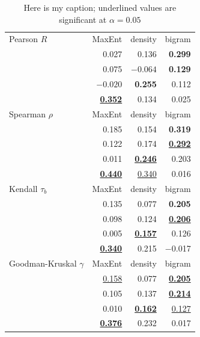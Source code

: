 \begin{table}
\centering
\begin{tabular}{l r r r}
\toprule
Pearson $R$                 & MaxEnt              & density             & bigram              \\
\citealt{Greenberg1964a} & 0.027               & 0.136               & \textbf{0.299}      \\
\citealt{Scholes1966}    & 0.075               & $-0.064$            & \textbf{0.129}      \\
\citealt{Albright2003a}  & $-0.020$            & \textbf{0.255}      & 0.112               \\
\citealt{Albright2007}   & \ul{\textbf{0.352}} & 0.134               & 0.025               \\
\bottomrule
Spearman $\rho$             & MaxEnt              & density             & bigram              \\
\midrule
\citealt{Greenberg1964a} & 0.185               & 0.154               & \textbf{0.319}      \\
\citealt{Scholes1966}    & 0.122               & 0.174               & \ul{\textbf{0.292}} \\
\citealt{Albright2003a}  & 0.011               & \ul{\textbf{0.246}} & 0.203               \\
\citealt{Albright2007}   & \ul{\textbf{0.440}} & \ul{0.340}          & 0.016               \\ 
\bottomrule
Kendall $\tau_b$            & MaxEnt              & density             & bigram \\
\midrule
\citealt{Greenberg1964a} & 0.135               & 0.077               & \textbf{0.205}      \\
\citealt{Scholes1966}    & 0.098               & 0.124               & \ul{\textbf{0.206}} \\
\citealt{Albright2003a}  & 0.005               & \ul{\textbf{0.157}} & 0.126               \\
\citealt{Albright2007}   & \ul{\textbf{0.340}} & 0.215               & $-$0.017            \\
\bottomrule
Goodman-Kruskal $\gamma$    & MaxEnt              & density             & bigram \\
\midrule
\citealt{Greenberg1964a} & \ul{0.158}          & 0.077               & \ul{\textbf{0.205}} \\
\citealt{Scholes1966}    & 0.105               & 0.137               & \ul{\textbf{0.214}} \\
\citealt{Albright2003a}  & 0.010               & \ul{\textbf{0.162}} & \ul{0.127}          \\
\citealt{Albright2007}   & \ul{\textbf{0.376}} & 0.232               & 0.017               \\
\bottomrule
\end{tabular}

\caption{Here is my caption; underlined values are significant at $\alpha = 0.05$}
\end{table}

